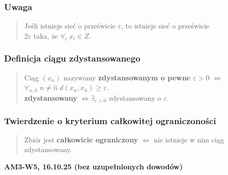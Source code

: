 \documentclass[10pt,a4paper]{article}
\newcommand{\zagadnienie}[3]{%
    \clearpage %
    \noindent\textbf{#1} #2\\
    #3
}
\begin{document}
{    \subsubsection*{Uwaga}
    \begin{quote}
    Jeśli istnieje sieć o prześwicie $\varepsilon$, to istnieje sieć o prześwicie \\
    $2\varepsilon$ taka, że $\forall_{i} \; x_i \in Z$.
    \end{quote}

    \subsubsection*{Definicja ciągu zdystansowanego}
    \begin{quote}
    Ciąg $(x_n)$ nazywamy \textbf{zdystansowanym o pewne $\varepsilon > 0$} $\iff$ \\
    $\forall_{n, \hat{n}} \; n \ne \hat{n} \; d(x_n, x_{\hat{n}}) \ge \varepsilon$. \\
    \textbf{zdystansowany} $\iff \exists_{\varepsilon > 0}$ zdystansowany o $\varepsilon$.
    \end{quote}

    \subsubsection*{Twierdzenie o kryterium całkowitej ograniczoności}
    \begin{quote}
    Zbiór jest \textbf{całkowicie ograniczony} $\iff$ nie istnieje w nim ciąg zdystansowany.
    \end{quote}
}
\zagadnienie{AM3-W5, 16.10.25 (bez uzupełnionych dowodów)}{}
\end{document}
